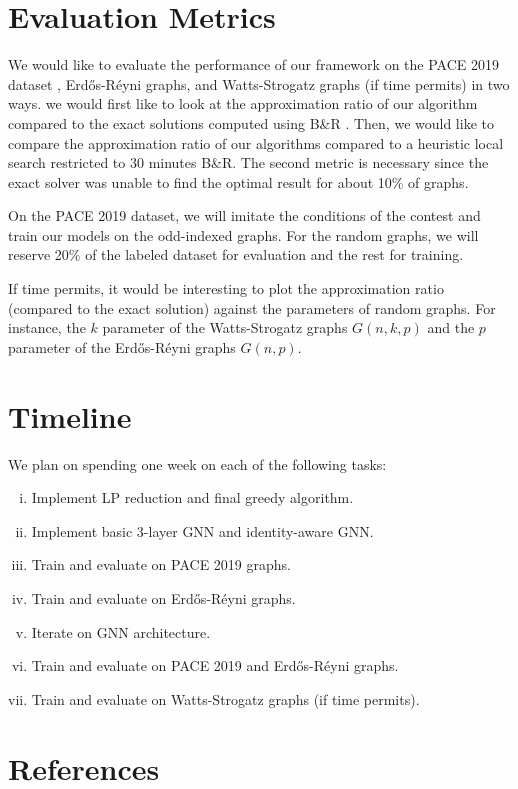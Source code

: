 \documentclass{article}
\begin{document}
\section{Evaluation Metrics}
We would like to evaluate the performance of our framework on the PACE 2019 dataset \citet{pace2019},
Erd\H os-R\'eyni graphs,
and Watts-Strogatz graphs (if time permits) in two ways.
we would first like to look at the approximation ratio of our algorithm compared to the exact solutions
computed using B\&R \citet{kamis}.
Then, we would like to compare the approximation ratio of our algorithms compared to a heuristic local search
restricted to 30 minutes B\&R.
The second metric is necessary since the exact solver was unable to find the optimal result for about 10\% of graphs.

On the PACE 2019 dataset,
we will imitate the conditions of the contest and train our models on the odd-indexed graphs.
For the random graphs,
we will reserve 20\% of the labeled dataset for evaluation
and the rest for training.

If time permits,
it would be interesting to plot the approximation ratio (compared to the exact solution)
against the parameters of random graphs.
For instance, the $k$ parameter of the Watts-Strogatz graphs $G(n, k, p)$
and the $p$ parameter of the Erd\H os-R\'eyni graphs $G(n, p)$.

\section{Timeline}
We plan on spending one week on each of the following tasks:
\begin{enumerate}[(i)]
  \item Implement LP reduction and final greedy algorithm.
  \item Implement basic 3-layer GNN and identity-aware GNN.
  \item Train and evaluate on PACE 2019 graphs.
  \item Train and evaluate on Erd\H os-R\'eyni graphs.
  \item Iterate on GNN architecture.
  \item Train and evaluate on PACE 2019 and Erd\H os-R\'eyni graphs.
  \item Train and evaluate on Watts-Strogatz graphs (if time permits).
\end{enumerate}

\section{References}


\end{document}
